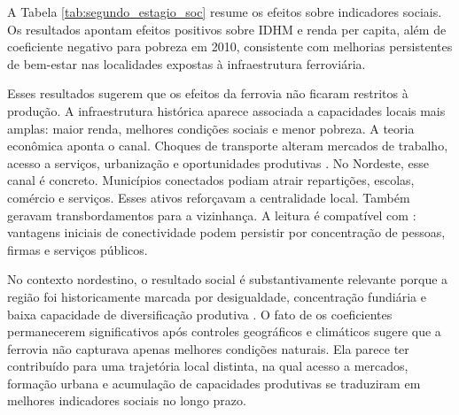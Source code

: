 \documentclass[12pt,a4paper]{article}
\begin{document}
A Tabela \ref{tab:segundo_estagio_soc} resume os efeitos sobre indicadores sociais. Os resultados apontam efeitos positivos sobre IDHM e renda per capita, além de coeficiente negativo para pobreza em 2010, consistente com melhorias persistentes de bem-estar nas localidades expostas à infraestrutura ferroviária.

Esses resultados sugerem que os efeitos da ferrovia não ficaram restritos à produção. A infraestrutura histórica aparece associada a capacidades locais mais amplas: maior renda, melhores condições sociais e menor pobreza. A teoria econômica aponta o canal. Choques de transporte alteram mercados de trabalho, acesso a serviços, urbanização e oportunidades produtivas \citep{donaldson2018,banerjee2012}. No Nordeste, esse canal é concreto. Municípios conectados podiam atrair repartições, escolas, comércio e serviços. Esses ativos reforçavam a centralidade local. Também geravam transbordamentos para a vizinhança. A leitura é compatível com \citet{jedwab2016}: vantagens iniciais de conectividade podem persistir por concentração de pessoas, firmas e serviços públicos.

No contexto nordestino, o resultado social é substantivamente relevante porque a região foi historicamente marcada por desigualdade, concentração fundiária e baixa capacidade de diversificação produtiva \citep{furtado1959,cano1977}. O fato de os coeficientes permanecerem significativos após controles geográficos e climáticos sugere que a ferrovia não capturava apenas melhores condições naturais. Ela parece ter contribuído para uma trajetória local distinta, na qual acesso a mercados, formação urbana e acumulação de capacidades produtivas se traduziram em melhores indicadores sociais no longo prazo.
\end{document}
